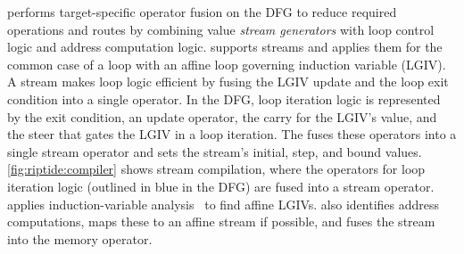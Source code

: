 \riptide performs target-specific operator fusion on the DFG to
reduce required operations and routes by combining value {\em stream generators} with loop
control logic and address computation logic.
%
\riptide supports streams and applies them for the common case 
of a loop with an affine loop governing induction variable (LGIV).
%
A stream makes loop logic efficient by fusing the LGIV update and the loop
exit condition into a single operator.
%
In the DFG, loop iteration logic is represented by the exit condition, an
update operator, the carry for the LGIV's value, and the steer that
gates the LGIV in a loop iteration.
%
The \mend fuses these operators into a single stream operator and sets
the stream's initial, step, and bound values.
%
\autoref{fig:riptide:compiler} shows stream compilation, where
the operators for loop iteration logic (outlined in blue in the 
DFG) are fused into a stream operator.
%
\riptide applies induction-variable analysis~\cite{dragon,zima-scev} to 
find affine LGIVs. %
%
%
%
%
%
%
\riptide also identifies address computations, maps these to an affine
stream if possible, and fuses the stream into the memory operator.
%

